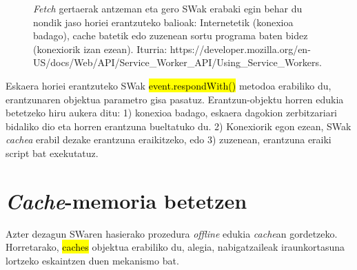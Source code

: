 \begin{figure}[ht]
	\centering
{}
\caption{\textit{Fetch} gertaerak antzeman eta gero SWak erabaki egin behar du nondik jaso horiei erantzuteko balioak: Internetetik (konexioa badago), cache batetik edo zuzenean sortu programa baten bidez (konexiorik izan ezean).
Iturria:  https://developer.mozilla.org/en-US/docs/Web/API/Service\_Worker\_API/Using\_Service\_Workers.}
\label{fig:serviceworker4}
\end{figure}


 Eskaera horiei erantzuteko SWak  \hl{event.respondWith()} metodoa erabiliko du, erantzunaren objektua parametro gisa pasatuz. Erantzun-objektu horren edukia betetzeko hiru aukera ditu: 1) konexioa badago, eskaera dagokion zerbitzariari bidaliko dio eta horren erantzuna bueltatuko du. 2) Konexiorik egon ezean, SWak \textit{cachea} erabil dezake erantzuna eraikitzeko, edo 3) zuzenean, erantzuna eraiki script bat exekutatuz.

\section{\textit{Cache}-memoria betetzen}

Azter dezagun SWaren hasierako prozedura \textit{offline} edukia \textit{cache}an gordetzeko. Horretarako, \hl{caches} objektua erabiliko du, alegia, nabigatzaileak iraunkortasuna lortzeko eskaintzen duen mekanismo bat.

